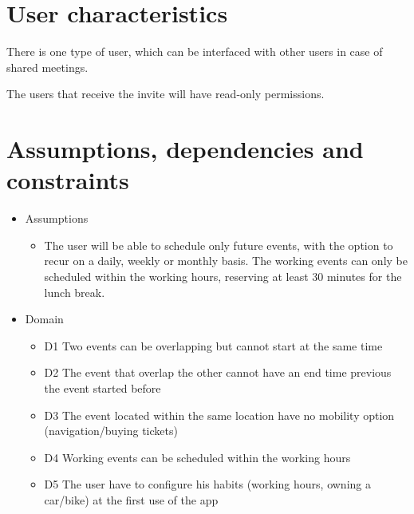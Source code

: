 \section{User characteristics}
\label{sec:usercharacteristics}
\begin{description}
\item There is one type of user, which can be interfaced with other users in case of shared meetings. 
\item The users that receive the invite will have read-only permissions.
\end{description}

\section{Assumptions, dependencies and constraints}
\label{sec:assumpdepenconst}

\begin{itemize}
\item Assumptions
\begin{itemize}
\item The user will be able to schedule only future events, with the option to recur on a daily, weekly or monthly basis.
The working events can only be scheduled within the working hours, reserving at least 30 minutes for the lunch break.
\end{itemize}

\item Domain
\begin{itemize}
\item D1 Two events can be overlapping but cannot start at the same time
\item D2 The event that overlap the other cannot have an end time previous the event started before
\item D3 The event located within the same location have no mobility option (navigation/buying tickets)
\item D4 Working events can be scheduled within the working hours
\item D5 The user have to configure his habits (working hours, owning a car/bike) at the first use of the app

\end{itemize}
\end{itemize}


